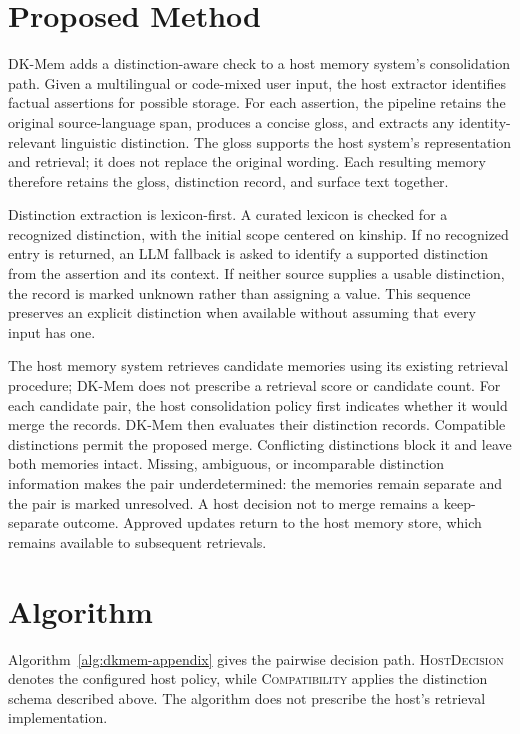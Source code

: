 \documentclass[conference]{IEEEtran}
\begin{document}
\appendices

\section{Proposed Method}
\label{app:method}

DK-Mem adds a distinction-aware check to a host memory system's consolidation path. Given a multilingual or code-mixed user input, the host extractor identifies factual assertions for possible storage. For each assertion, the pipeline retains the original source-language span, produces a concise gloss, and extracts any identity-relevant linguistic distinction. The gloss supports the host system's representation and retrieval; it does not replace the original wording. Each resulting memory therefore retains the gloss, distinction record, and surface text together.

Distinction extraction is lexicon-first. A curated lexicon is checked for a recognized distinction, with the initial scope centered on kinship. If no recognized entry is returned, an LLM fallback is asked to identify a supported distinction from the assertion and its context. If neither source supplies a usable distinction, the record is marked unknown rather than assigning a value. This sequence preserves an explicit distinction when available without assuming that every input has one.

The host memory system retrieves candidate memories using its existing retrieval procedure; DK-Mem does not prescribe a retrieval score or candidate count. For each candidate pair, the host consolidation policy first indicates whether it would merge the records. DK-Mem then evaluates their distinction records. Compatible distinctions permit the proposed merge. Conflicting distinctions block it and leave both memories intact. Missing, ambiguous, or incomparable distinction information makes the pair underdetermined: the memories remain separate and the pair is marked unresolved. A host decision not to merge remains a keep-separate outcome. Approved updates return to the host memory store, which remains available to subsequent retrievals.

\section{Algorithm}
\label{app:algorithm}

Algorithm~\ref{alg:dkmem-appendix} gives the pairwise decision path. \textsc{HostDecision} denotes the configured host policy, while \textsc{Compatibility} applies the distinction schema described above. The algorithm does not prescribe the host's retrieval implementation.
\end{document}
